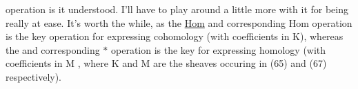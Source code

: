 
operation is it understood.  I'll have to play around a little more with
it for being really at ease.  It's worth the while,  as  the \uline{Hom}
and corresponding Hom  operation is the key operation for expressing
cohomology  (with coefficients in K),  whereas the \hand{$\mathbin{\tikz[baseline=-.5ex]{\node[circle,draw,inner sep=.04em] {\ensuremath{\textcolor{black}{*}}};}}$} and corresponding
$*$  operation is the key for expressing homology  (with coefficients in M ,
where K and M are the sheaves occuring in (65) and (67) respectively).


